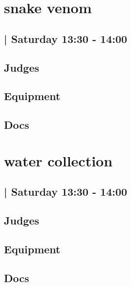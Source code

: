 \documentclass[10pt]{article}
\begin{document}
		\begin{minipage}{\linewidth}
		\setcounter{section}{30}
	\section{snake venom }
	\subsection*{ | Saturday 13:30 - 14:00}

	

	\begin{multicols}{2}
	\subsection*{\faUsers \: Judges}
	\begin{itemize}
		\end{itemize}
	\columnbreak
	\subsection*{\faWrench \: Equipment}
	        \vfill\null
        \subsection*{\faFile \: Docs}
     	\end{multicols}


	\vspace{1cm}
	\end{minipage}

		\begin{minipage}{\linewidth}
		\setcounter{section}{31}
	\section{water collection }
	\subsection*{ | Saturday 13:30 - 14:00}

	

	\begin{multicols}{2}
	\subsection*{\faUsers \: Judges}
	\begin{itemize}
		\end{itemize}
	\columnbreak
	\subsection*{\faWrench \: Equipment}
	        \vfill\null
        \subsection*{\faFile \: Docs}
     	\end{multicols}


	\vspace{1cm}
	\end{minipage}
\end{document}

